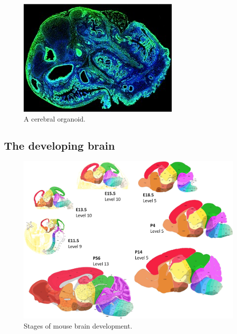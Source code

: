 \documentclass[12pt,oneside,onecolumn,a4paper]{article}
\begin{document}
\begin{figure}[h!]
\begin{center}
\includegraphics[width=0.8\columnwidth]{figures/cerebral_organoid/cerebral-organoid-for-Broad-web-300x218}
\caption{A cerebral organoid.\citep{nguyen_wang_nikolakopoulou_2015}%
}
\end{center}
\end{figure}

\subsection{The developing brain}\citep{Bakken_2015}


\begin{figure}[h!]
\begin{center}
\includegraphics[width=0.8\columnwidth]{figures/160913_thompson_atlas/160913_thompson_atlas}
\caption{Stages of mouse brain development. \citep{Thompson_2014}%
}
\end{center}
\end{figure}
\end{document}
